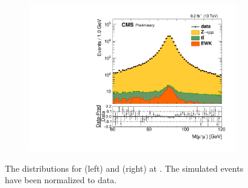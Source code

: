 \begin{figure}
\begin{subfigure}{.50\textwidth}
\end{subfigure}%
\centering
\begin{subfigure}{.50\textwidth}
\centering
\includegraphics[width=\linewidth]{plots/Z/13tev/zmmlog.pdf}
\end{subfigure}%
\caption{The \mll distributions for \zee (left) and \zmm (right) at \sh. The simulated events have been normalized to data.}
\label{fig:z:z:13}
\end{figure}